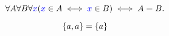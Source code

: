 \begin{frame}{}
  \begin{definition}
    \[
      \forall A \forall B \forall \textcolor{blue}{x} (\textcolor{blue}{x} \in A \iff \textcolor{blue}{x} \in B) \iff A = B.
    \]
  \end{definition}

  \pause
  \[
    \{a, a\} = \{a\}
  \]


\end{frame}

% 
% 
% 
% 
